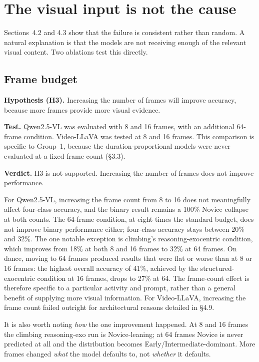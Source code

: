 \documentclass[logo,msc]{infthesis}
\newcommand{\runin}[1]{\par\medskip\noindent\textbf{#1}}
\begin{document}
\section{The visual input is not the cause}

Sections~4.2 and 4.3 show that the failure is consistent rather than
random. A natural explanation is that the models are not receiving enough
of the relevant visual content. Two ablations test this directly.

\subsection{Frame budget}

\runin{Hypothesis (H3).} Increasing the number of frames will improve
accuracy, because more frames provide more visual evidence.

\runin{Test.} Qwen2.5-VL was evaluated with 8 and 16 frames, with an
additional 64-frame condition. Video-LLaVA was tested at 8 and 16 frames.
This comparison is specific to Group~1, because the duration-proportional
models were never evaluated at a fixed frame count (§3.3).

\runin{Verdict.} H3 is not supported. Increasing the number of frames
does not improve performance.

For Qwen2.5-VL, increasing the frame count from 8 to 16 does not
meaningfully affect four-class accuracy, and the binary result remains a
100\% Novice collapse at both counts. The 64-frame condition, at eight
times the standard budget, does not improve binary performance either;
four-class accuracy stays between 20\% and 32\%. The one notable exception
is climbing's reasoning-exocentric condition, which improves from 18\% at
both 8 and 16 frames to 32\% at 64 frames. On dance, moving to 64 frames
produced results that were flat or worse than at 8 or 16 frames: the
highest overall accuracy of 41\%, achieved by the structured-exocentric
condition at 16 frames, drops to 27\% at 64. The frame-count effect is
therefore specific to a particular activity and prompt, rather than a
general benefit of supplying more visual information. For Video-LLaVA,
increasing the frame count failed outright for architectural reasons
detailed in §4.9.

It is also worth noting \emph{how} the one improvement happened. At 8 and
16 frames the climbing reasoning-exo run is Novice-leaning; at 64 frames
Novice is never predicted at all and the distribution becomes
Early/Intermediate-dominant. More frames changed \emph{what} the model
defaults to, not \emph{whether} it defaults.
\end{document}
